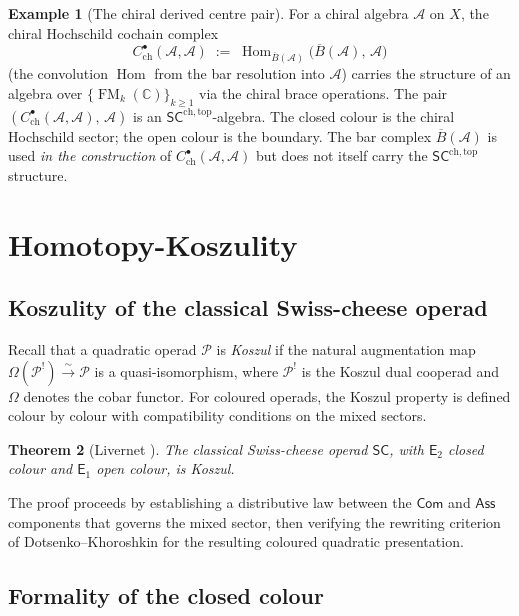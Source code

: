 \documentclass[11pt,reqno]{amsart}
\newtheorem{theorem}{Theorem}[section]
\theoremstyle{definition}
\newtheorem{example}[theorem]{Example}
\theoremstyle{remark}
\newcommand{\cA}{\mathcal{A}}
\newcommand{\cP}{\mathcal{P}}
\newcommand{\CC}{\mathbb{C}}
\newcommand{\barB}{\overline{B}}
\newcommand{\Eone}{\mathsf{E}_{1}}
\newcommand{\Etwo}{\mathsf{E}_{2}}
\newcommand{\SC}{\mathsf{SC}}
\newcommand{\SCchtop}{\mathsf{SC}^{\mathrm{ch,top}}}
\newcommand{\Ass}{\mathsf{Ass}}
\newcommand{\Com}{\mathsf{Com}}
\DeclareMathOperator{\Hom}{Hom}
\DeclareMathOperator{\FM}{FM}
\numberwithin{equation}{section}
\providecommand{\ClaimStatusProvedElsewhere}{}
\begin{document}
\begin{example}[The chiral derived centre pair]
\label{ex:derived-centre-pair}
For a chiral algebra $\cA$ on $X$, the chiral Hochschild cochain
complex
\[
  C^\bullet_{\mathrm{ch}}(\cA,\cA)
  \;:=\;
  \Hom_{\barB(\cA)}\bigl(\barB(\cA),\, \cA\bigr)
\]
(the convolution $\Hom$ from the bar resolution into $\cA$) carries
the structure of an algebra over $\{\FM_k(\CC)\}_{k \geq 1}$
via the chiral brace operations.  The pair
$(C^\bullet_{\mathrm{ch}}(\cA,\cA),\, \cA)$ is an
$\SCchtop$-algebra.  The closed colour is the chiral Hochschild
sector; the open colour is the boundary.  The bar complex $\barB(\cA)$ is used
\emph{in the construction} of $C^\bullet_{\mathrm{ch}}(\cA,\cA)$
but does not itself carry the $\SCchtop$ structure.
\end{example}


\section{Homotopy-Koszulity}
\label{sec:homotopy-koszulity}

\subsection{Koszulity of the classical Swiss-cheese operad}

Recall that a quadratic operad $\cP$ is \emph{Koszul} if the
natural augmentation map
$\Omega(\cP^!) \xrightarrow{\sim} \cP$ is a quasi-isomorphism,
where $\cP^!$ is the Koszul dual cooperad and $\Omega$ denotes
the cobar functor.  For coloured operads, the Koszul property is
defined colour by colour with compatibility conditions on the
mixed sectors.

\begin{theorem}[Livernet {\cite{Liv06}}]
\label{thm:livernet-koszulity}
\ClaimStatusProvedElsewhere{}
The classical Swiss-cheese operad $\SC$, with $\Etwo$ closed
colour and $\Eone$ open colour, is Koszul.
\end{theorem}

The proof proceeds by establishing a distributive law between
the $\Com$ and $\Ass$ components that governs the mixed sector,
then verifying the rewriting criterion of Dotsenko--Khoroshkin
\cite{DK10} for the resulting coloured quadratic presentation.

\subsection{Formality of the closed colour}
\end{document}
